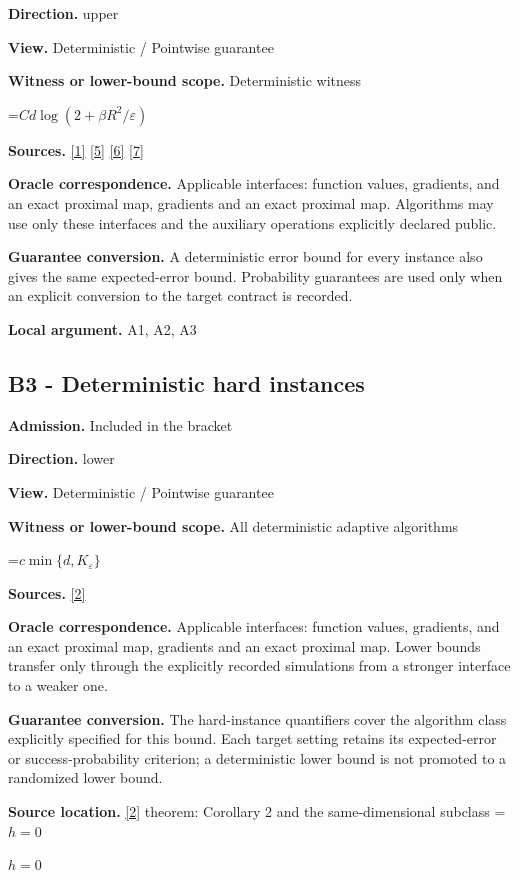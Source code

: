 \documentclass[10pt,a4paper]{article}
\newcommand{\AtlasMath}[1]{\par\begingroup\centering\setbox0=\hbox{$\displaystyle #1$}\ifdim\wd0>1.4\linewidth\typeout{ATLAS WIDE FORMULA: \the\wd0}\fi\ifdim\wd0>\linewidth\resizebox{\linewidth}{!}{\box0}\else\box0\fi\par\endgroup}
\newcommand{\AtlasInlineMath}[1]{\begingroup\setbox0=\hbox{$#1$}\ifdim\wd0>.4\linewidth\endgroup\AtlasMath{#1}\else\endgroup$#1$\fi}
\begin{document}
\textbf{Direction.} upper

\textbf{View.} Deterministic / Pointwise guarantee

\textbf{Witness or lower-bound scope.} Deterministic witness

\AtlasMath{Cd\log(2+\beta R^2/\varepsilon)}
\textbf{Sources.} \href{https://www.tau.ac.il/~becka/FISTA.pdf}{[1]} \href{https://arxiv.org/pdf/1405.4980}{[5]} \href{https://www2.isye.gatech.edu/~nemirovs/MOR_AccuracyCertificates.pdf}{[6]} \href{https://arxiv.org/pdf/2609.20701}{[7]}

\textbf{Oracle correspondence.} Applicable interfaces: function values, gradients, and an exact proximal map, gradients and an exact proximal map. Algorithms may use only these interfaces and the auxiliary operations explicitly declared public.

\textbf{Guarantee conversion.} A deterministic error bound for every instance also gives the same expected-error bound. Probability guarantees are used only when an explicit conversion to the target contract is recorded.

\textbf{Local argument.} A1, A2, A3

\subsection{B3 - Deterministic hard instances}
\textbf{Admission.} Included in the bracket

\textbf{Direction.} lower

\textbf{View.} Deterministic / Pointwise guarantee

\textbf{Witness or lower-bound scope.} All deterministic adaptive algorithms

\AtlasMath{c\min\{d,K_\varepsilon\}}
\textbf{Sources.} \href{https://arxiv.org/pdf/2101.09740v2}{[2]}

\textbf{Oracle correspondence.} Applicable interfaces: function values, gradients, and an exact proximal map, gradients and an exact proximal map. Lower bounds transfer only through the explicitly recorded simulations from a stronger interface to a weaker one.

\textbf{Guarantee conversion.} The hard-instance quantifiers cover the algorithm class explicitly specified for this bound. Each target setting retains its expected-error or success-probability criterion; a deterministic lower bound is not promoted to a randomized lower bound.

\textbf{Source location.} \href{https://arxiv.org/pdf/2101.09740v2}{[2]} theorem: Corollary 2 and the same-dimensional subclass \AtlasInlineMath{h=0}
\end{document}
